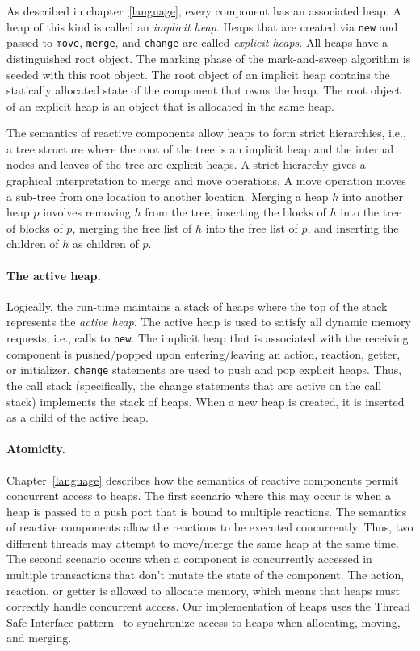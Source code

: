 As described in chapter~\ref{language}, every component has an associated heap.
A heap of this kind is called an \emph{implicit heap}.
Heaps that are created via \verb+new+ and passed to \verb+move+, \verb+merge+, and \verb+change+ are called \emph{explicit heaps}.
All heaps have a distinguished root object.
The marking phase of the mark-and-sweep algorithm is seeded with this root object.
The root object of an implicit heap contains the statically allocated state of the component that owns the heap.
The root object of an explicit heap is an object that is allocated in the same heap.

The semantics of reactive components allow heaps to form strict hierarchies, i.e., a tree structure where the root of the tree is an implicit heap and the internal nodes and leaves of the tree are explicit heaps.
A strict hierarchy gives a graphical interpretation to merge and move operations.
A move operation moves a sub-tree from one location to another location.
 Merging a heap $h$ into another heap $p$ involves removing $h$ from the tree, inserting the blocks of $h$ into the tree of blocks of $p$, merging the free list of $h$ into the free list of $p$, and inserting the children of $h$ as children of $p$.

\paragraph{The active heap.}
Logically, the run-time maintains a stack of heaps where the top of the stack represents the \emph{active heap}.
The active heap is used to satisfy all dynamic memory requests, i.e., calls to \verb+new+.
The implicit heap that is associated with the receiving component is pushed/popped upon entering/leaving an action, reaction, getter, or initializer.
\verb+change+ statements are used to push and pop explicit heaps.
Thus, the call stack (specifically, the change statements that are active on the call stack) implements the stack of heaps.
When a new heap is created, it is inserted as a child of the active heap.

\paragraph{Atomicity.}
Chapter~\ref{language} describes how the semantics of reactive components permit concurrent access to heaps.
The first scenario where this may occur is when a heap is passed to a push port that is bound to multiple reactions.
The semantics of reactive components allow the reactions to be executed concurrently.
Thus, two different threads may attempt to move/merge the same heap at the same time.
The second scenario occurs when a component is concurrently accessed in multiple transactions that don't mutate the state of the component.
The action, reaction, or getter is allowed to allocate memory, which means that heaps must correctly handle concurrent access.
Our implementation of heaps uses the Thread Safe Interface pattern~\cite{schmidt2000pattern} to synchronize access to heaps when allocating, moving, and merging.

